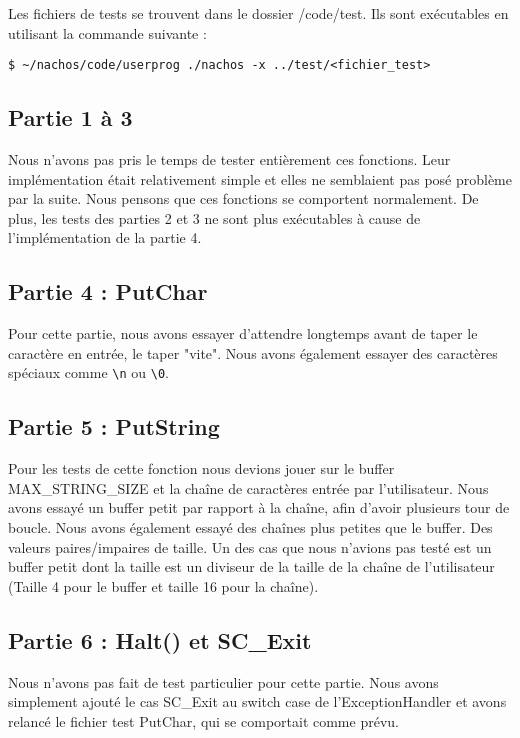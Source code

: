 \documentclass[a4paper]{article}
\newcommand*{\escape}[1]{\texttt{\textbackslash#1}}
\begin{document}
Les fichiers de tests se trouvent dans le dossier /code/test. Ils sont exécutables
en utilisant la commande suivante :

\begin{verbatim}
$ ~/nachos/code/userprog ./nachos -x ../test/<fichier_test>
\end{verbatim}

\subsection{Partie 1 à 3}

Nous n'avons pas pris le temps de tester entièrement ces fonctions. Leur implémentation
était relativement simple et elles ne semblaient pas posé problème par la suite.
Nous pensons que ces fonctions se comportent normalement. De plus, les tests des
parties 2 et 3 ne sont plus exécutables à cause de l'implémentation de la partie 4.

\subsection{Partie 4 : PutChar}

Pour cette partie, nous avons essayer d'attendre longtemps avant de taper le
caractère en entrée, le taper "vite". Nous avons également essayer des caractères
spéciaux comme \escape{n} ou \escape{0}.

\subsection{Partie 5 : PutString}

Pour les tests de cette fonction nous devions jouer sur le buffer
MAX\_STRING\_SIZE et la chaîne de caractères entrée par l'utilisateur. Nous avons
essayé un buffer petit par rapport à la chaîne, afin d'avoir plusieurs tour de boucle.
Nous avons également essayé des chaînes plus petites que le buffer. Des valeurs
paires/impaires de taille. Un des cas que nous n'avions pas testé est un buffer petit
dont la taille est un diviseur de la taille de la chaîne de l'utilisateur (Taille
4 pour le buffer et taille 16 pour la chaîne).

\subsection{Partie 6 : Halt() et SC\_Exit}

Nous n'avons pas fait de test particulier pour cette partie. Nous avons simplement
ajouté le cas SC\_Exit au switch case de l'ExceptionHandler et avons relancé le
fichier test PutChar, qui se comportait comme prévu.
\end{document}
